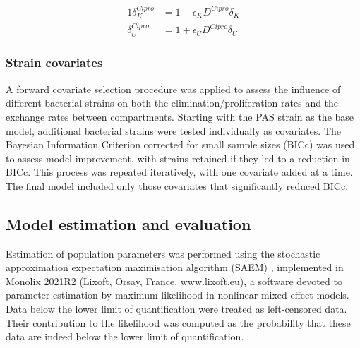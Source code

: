 \documentclass{article}
\begin{document}
\begin{alignat}{1}
\delta_{K}^{Cipro} &= 1 - \epsilon_K D^{Cipro} \delta_{K} \nonumber \\
\delta_{U}^{Cipro} &= 1 + \epsilon_U D^{Cipro} \delta_{U}
\end{alignat}




\subsubsection{Strain covariates}
A forward covariate selection procedure was applied to assess the influence of different bacterial strains on both the elimination/proliferation rates and the exchange rates between compartments. Starting with the PAS strain as the base model, additional bacterial strains were tested individually as covariates. The Bayesian Information Criterion corrected for small sample sizes (BICc) was used to assess model improvement, with strains retained if they led to a reduction in BICc.
%
This process was repeated iteratively, with one covariate added at a time. The final model included only those covariates that significantly reduced BICc.









\subsection{Model estimation and evaluation}

Estimation of population parameters was performed using the stochastic approximation expectation maximisation algorithm (SAEM) \cite{kuhn2005maximum}, implemented in Monolix 2021R2 (Lixoft, Orsay, France, www.lixoft.eu), a software devoted to parameter estimation by maximum likelihood in nonlinear mixed effect models. Data below the lower limit of quantification were treated as left-censored data. Their contribution to the likelihood was computed as the probability that these data are indeed below the lower limit of quantification\cite{samson2006extension}. 
\end{document}
